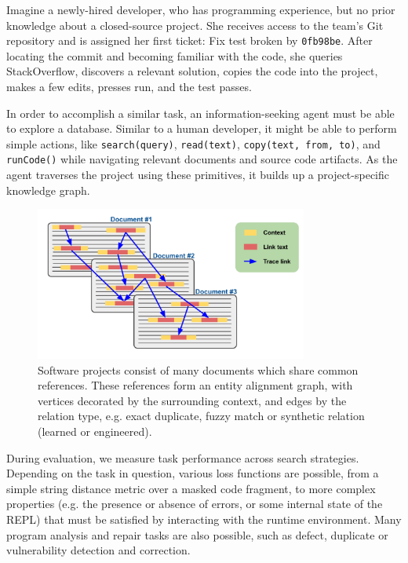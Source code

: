 \documentclass[11pt]{article}
\begin{document}
Imagine a newly-hired developer, who has programming experience, but no prior knowledge about a closed-source project. She receives access to the team's Git repository and is assigned her first ticket: Fix test broken by \texttt{0fb98be}. After locating the commit and becoming familiar with the code, she queries StackOverflow, discovers a relevant solution, copies the code into the project, makes a few edits, presses run, and the test passes.

In order to accomplish a similar task, an information-seeking agent must be able to explore a database. Similar to a human developer, it might be able to perform simple actions, like \texttt{search(query)}, \texttt{read(text)}, \texttt{copy(text, from, to)}, and \texttt{runCode()} while navigating relevant documents and source code artifacts. As the agent traverses the project using these primitives, it builds up a project-specific knowledge graph.

\begin{figure}
  \centering
  \includegraphics[width=0.8\textwidth]{use_graph}
  \caption{Software projects consist of many documents which share common references. These references form an entity alignment graph, with vertices decorated by the surrounding context, and edges by the relation type, e.g. exact duplicate, fuzzy match or synthetic relation (learned or engineered).}
\end{figure}

During evaluation, we measure task performance across search strategies. Depending on the task in question, various loss functions are possible, from a simple string distance metric over a masked code fragment, to more complex properties (e.g. the presence or absence of errors, or some internal state of the REPL) that must be satisfied by interacting with the runtime environment. Many program analysis and repair tasks are also possible, such as defect, duplicate or vulnerability detection and correction.
\end{document}
